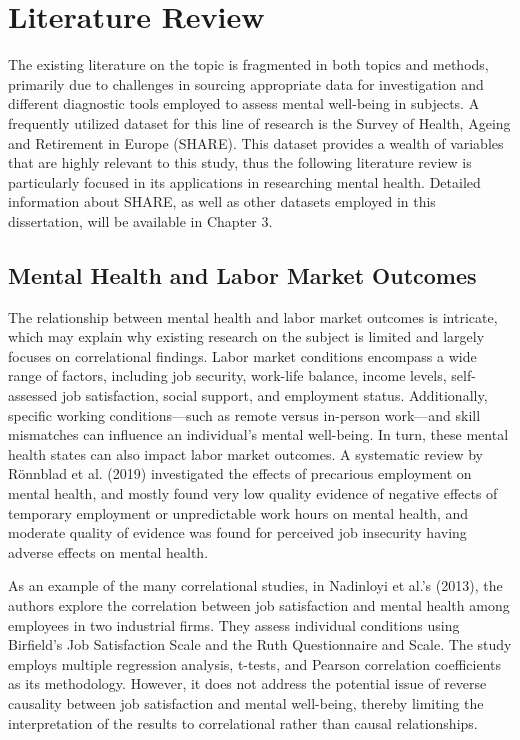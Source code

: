 \section{Literature Review}
The existing literature on the topic is fragmented in both topics and methods, primarily due to challenges in sourcing appropriate data for investigation and different diagnostic tools employed to assess mental well-being in subjects. 
A frequently utilized dataset for this line of research is the Survey of Health, Ageing and Retirement in Europe (SHARE). This dataset provides a wealth of variables that are highly relevant to this study, thus the following literature review is particularly focused in its applications in researching mental health. Detailed information about SHARE, as well as other datasets employed in this dissertation, will be available in Chapter 3.




\subsection{Mental Health and Labor Market Outcomes}
    The relationship between mental health and labor market outcomes is intricate, which may explain why existing research on the subject is limited and largely focuses on correlational findings. Labor market conditions encompass a wide range of factors, including job security, work-life balance, income levels, self-assessed job satisfaction, social support, and employment status. Additionally, specific working conditions—such as remote versus in-person work—and skill mismatches can influence an individual's mental well-being. In turn, these mental health states can also impact labor market outcomes. A systematic review by Rönnblad et al. (2019) investigated the effects of precarious employment on mental health, and mostly found very low quality evidence of negative effects of temporary employment or unpredictable work hours on mental health, and moderate quality of evidence was found for perceived job insecurity having adverse effects on mental health. 

    As an example of the many correlational studies, in Nadinloyi et al.'s (2013), the authors explore the correlation between job satisfaction and mental health among employees in two industrial firms. They assess individual conditions using Birfield's Job Satisfaction Scale and the Ruth Questionnaire and Scale. The study employs multiple regression analysis, t-tests, and Pearson correlation coefficients as its methodology. However, it does not address the potential issue of reverse causality between job satisfaction and mental well-being, thereby limiting the interpretation of the results to correlational rather than causal relationships. 


